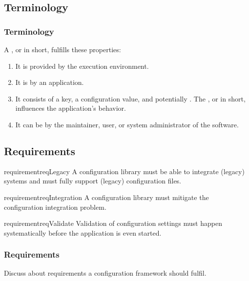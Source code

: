 \documentclass{beamer}
\begin{document}
\subsection{Terminology}
\begin{frame}
	\frametitle{Terminology}
\begin{definition}
\label{def:configuration-setting}
A ,
or  in short,
fulfills these properties:
\begin{enumerate}
\item
It is provided by the execution environment.
\item
It is  by an application.
\item
It consists of a key, a configuration value, and potentially .
The , or  in short, influences the application's behavior.
\item
It can be  by the maintainer, user, or system administrator of the software.
\end{enumerate}
\end{definition}
\end{frame}

\subsection{Requirements}
\begin{frame}
\begin{restatable}{requirement}{reqLegacy}
A configuration library must be able to integrate (legacy) systems and must fully support (legacy) configuration files.%
\label{req:legacy}
\end{restatable}

\begin{restatable}{requirement}{reqIntegration}
A configuration library must mitigate the configuration integration problem.%
\label{req:integration}
\end{restatable}

\begin{restatable}{requirement}{reqValidate}
Validation of configuration settings must happen systematically before the application is even started.
\end{restatable}
\end{frame}

\begin{assignment}
	\frametitle{Requirements}
	\begin{task}
	Discuss about requirements a configuration framework should fulfil.
	\end{task}
\end{assignment}
\end{document}
